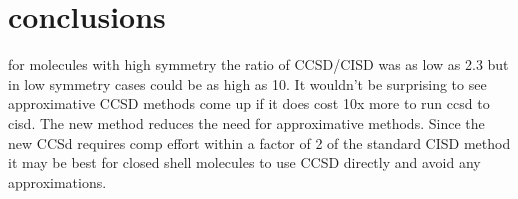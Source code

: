 \documentclass[10pt, draft]{article}
\begin{document}
  \section{conclusions}
  for molecules with high symmetry the ratio of CCSD/CISD was as low as 2.3 but in low symmetry cases could be as high as 10.  It wouldn't be surprising to see approximative CCSD methods come up if it does cost 10x more to run ccsd to cisd.  The new method reduces the need for approximative methods.  Since the new CCSd requires comp effort within a factor of 2 of the standard CISD method it may be best for closed shell molecules to use CCSD directly and avoid any approximations.  
  
 
\end{document}
